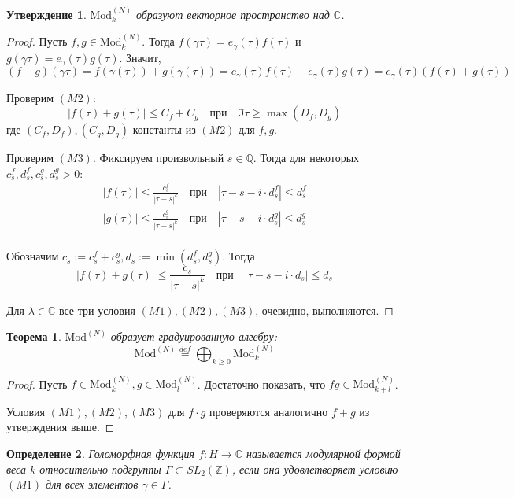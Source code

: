 \documentclass{article}
\newcommand{\ZZ}{\mathbb{Z}}
\newcommand{\CC}{\mathbb{C}}
\newcommand{\QQ}{\mathbb{Q}}
\theoremstyle{break}
\newtheorem{theorem}{Теорема}[section]
\newtheorem{definition}[theorem]{Определение}
\newtheorem{claim}{Утверждение}[section]
\newcommand{\ModkN}[2]{\text{Mod}_{#1}^{(#2)}}
\newcommand{\ModN}[1]{\text{Mod}^{(#1)}}
\begin{document}
\begin{claim}
	$\ModkN{k}{N}$ образуют векторное пространство над $\CC$.
\end{claim}
\begin{proof}
Пусть $f, g \in  \ModkN{k}{N}$. Тогда $f(\gamma \tau) = e_{\gamma}(\tau) f(\tau)$
и $g(\gamma \tau) = e_{\gamma}(\tau) g(\tau)$. Значит,
$$
(f + g)(\gamma \tau) = f(\gamma(\tau)) + g(\gamma(\tau)) 
= e_\gamma(\tau)f(\tau) + e_\gamma(\tau)g(\tau)
= e_\gamma(\tau)(f(\tau) + g(\tau))
$$

Проверим $(M2)$: 
$$
|f(\tau) + g(\tau)| \le C_f + C_g \quad \text{при} \quad 
\Im \tau \ge \max(D_f, D_g)
$$
где $(C_f, D_f), (C_g, D_g)$ константы из $(M2)$ для $f, g$.

Проверим $(M3)$. Фиксируем произвольный $s \in \QQ$. Тогда для некоторых 
$c_s^f, d_s^f, c_s^g, d_s^g > 0$:
\begin{gather*}
	|f(\tau)| \le \frac{c_s^f}{|\tau - s|^k} \quad \text{при} \quad 
		|\tau - s - i \cdot d_s^f| \le d_s^f \\	
	|g(\tau)| \le \frac{c_s^g}{|\tau - s|^k} \quad \text{при} \quad 
		|\tau - s - i \cdot d_s^g| \le d_s^g \\
\end{gather*}

Обозначим $c_s:=c_s^f + c_s^g, d_s:=\min(d_s^f, d_s^g)$. Тогда
$$
	|f(\tau) + g(\tau)| \le \frac{c_s}{|\tau - s|^k} \quad \text{при} \quad
	|\tau - s - i \cdot d_s| \le d_s
$$


Для $\lambda \in \CC$ все три условия $(M1), (M2), (M3)$, очевидно, выполняются.


\end{proof}

\begin{theorem}
	$\ModN{N}$ образует градуированную алгебру:
	$$
	\ModN{N} \stackrel{def}{=} \bigoplus_{k \ge 0} \ModkN{k}{N}
	$$
\end{theorem}

\begin{proof}
	Пусть $f \in \ModkN{k}{N}, g \in \ModkN{l}{N}$. Достаточно показать, что 
	$fg \in \ModkN{k+l}{N}$. 
	
	Условия $(M1), (M2), (M3)$ для $f \cdot g$ проверяются аналогично $f+g$ из утверждения выше.
\end{proof}


\begin{definition}
	Голоморфная функция $f: H \to \CC$ называется модулярной формой веса $k$ относительно подгруппы $\Gamma \subset SL_2(\ZZ)$, если она удовлетворяет условию $(M1)$ для всех элементов $\gamma \in \Gamma$.
\end{definition}
\end{document}

